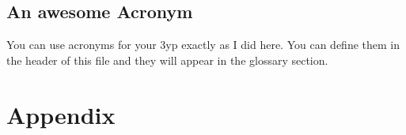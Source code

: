 \documentclass{report_template_oxford}
\begin{document}
\lipsum[1-6]

\subsection{An awesome Acronym}

You can use acronyms for your \gls{3yp} exactly as I did here.
You can define them in the header of this file and they will appear in the glossary section.




\newpage
{}
\section*{Appendix}
\end{document}
